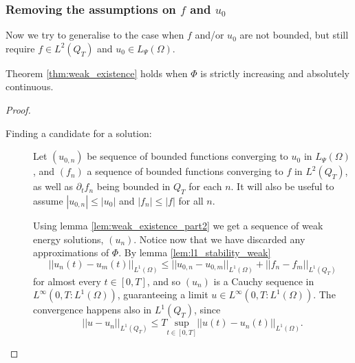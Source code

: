 \documentclass[11pt, a4paper]{article}
\begin{document}
\subsubsection{Removing the assumptions on $f$ and $u_0$}
Now we try to generalise to the case when $f$ and/or $u_0$ are not bounded, but still require $f \in L^2(Q_T)$ and $u_0 \in L_{\Psi}(\Omega)$.

\begin{lemma}
Theorem \ref{thm:weak_existence} holds when $\Phi$ is strictly increasing and absolutely continuous.
\end{lemma}
\begin{proof}



\begin{description}
\item[Finding a candidate for a solution:]
Let $(u_{0,n})$ be sequence of bounded functions converging to $u_0$ in $L_{\Psi}(\Omega)$, and $(f_n)$ a sequence of bounded functions converging to $f$ in $L^2(Q_T)$, as well as $\partial_t f_n$ being bounded in $Q_T$ for each $n$. It will also be useful to assume $|u_{0,n}| \leq |u_0|$ and $|f_n| \leq |f|$ for all $n$.

Using lemma \ref{lem:weak_existence_part2} we get a sequence of weak energy solutions, $(u_n)$. Notice now that we have discarded any approximations of $\Phi$. By lemma \ref{lem:l1_stability_weak}
\begin{equation*}
||u_n(t) - u_m(t)||_{L^1(\Omega)} \leq ||u_{0,n} - u_{0,m}||_{L^1(\Omega)} + ||f_n - f_m||_{L^1(Q_T)}
\end{equation*}
for almost every $t \in [0,T]$, and so $(u_n)$ is a Cauchy sequence in $L^\infty(0,T: L^1(\Omega))$, guaranteeing a limit $u \in L^\infty(0,T: L^1(\Omega))$. The convergence happens also in $L^1(Q_T)$, since
\begin{equation*}
||u - u_n||_{L^1(Q_T)} \leq T\underset{t \in [0,T]}{\mathrm{sup}}||u(t) - u_n(t)||_{L^1(\Omega)}.
\end{equation*}


\end{description}
\end{proof}
\end{document}
